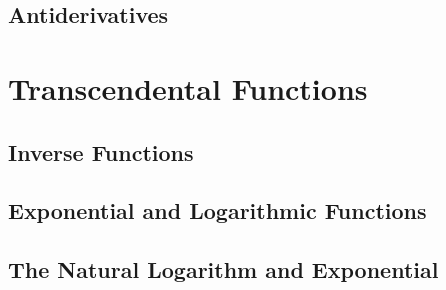 \documentclass[12pt]{memoir}
\begin{document}
    \section{Antiderivatives}
    

\chapter{Transcendental Functions}
    \section{Inverse Functions}
    
    \section{Exponential and Logarithmic Functions}
    
    \section{The Natural Logarithm and Exponential}
    
\end{document}
